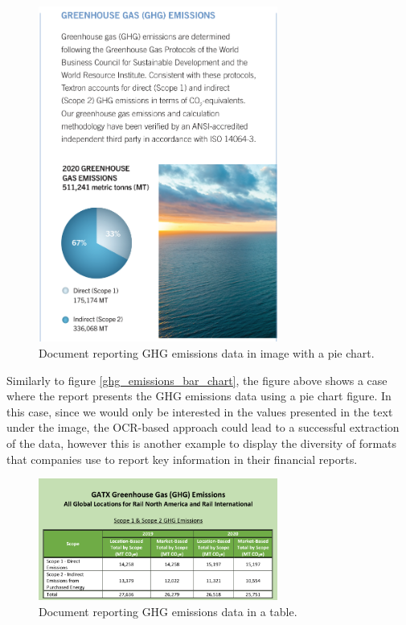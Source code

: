 \documentclass[english, 12pt, a4paper, elec, utf8, a-2b, online]{aaltothesis}
\begin{document}
\begin{figure}[H]
    \centering
    \includegraphics[width=0.7\textwidth]{images/ghg_emissions_pie_chart.png}
    \caption{Document reporting \ac{GHG} emissions data in image with a pie chart.}
    \label{ghg_emissions_pie_chart}
\end{figure}

Similarly to figure \ref{ghg_emissions_bar_chart}, the figure above shows a case where the report presents the \ac{GHG} emissions data using a pie chart figure.
In this case, since we would only be interested in the values presented in the text under the image, the OCR-based approach could lead to a successful extraction of the data, however this is another example to display the diversity of formats that companies use to report key information in their financial reports.

\begin{figure}[H]
    \centering
    \includegraphics[width=0.7\textwidth]{images/ghg_emissions_table.png}
    \caption{Document reporting \ac{GHG} emissions data in a table.}
    \label{ghg_emissions_table}
\end{figure}
\end{document}
